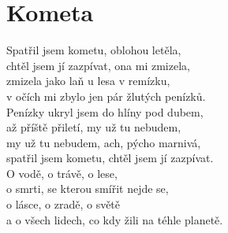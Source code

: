 \section{Kometa}
\onehalfspacing

Spatřil jsem kometu, oblohou letěla,\\
chtěl jsem jí zazpívat, ona mi zmizela,\\
zmizela jako laň u lesa v remízku,\\
v očích mi zbylo jen pár žlutých penízků.\\

\sloka
Penízky ukryl jsem do hlíny pod dubem,\\
až příště přiletí, my už tu nebudem,\\
my už tu nebudem, ach, pýcho marnivá,\\
spatřil jsem kometu, chtěl jsem jí zazpívat.\\

{}O vodě, o trávě, o lese,\\
o smrti, se kterou smířit nejde se,\\
o lásce, o zradě, o světě \\
a o všech lidech, co kdy žili na téhle planetě.\\

